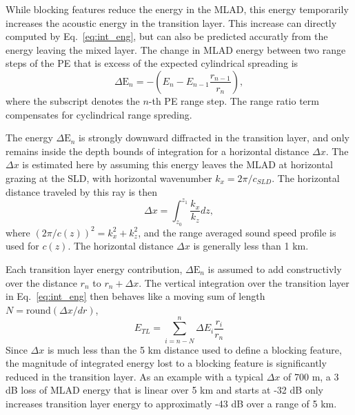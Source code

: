 \documentclass[preprint,NumberedRefs]{JASA}
\begin{document}
While blocking features reduce the energy in the MLAD, this energy temporarily increases the acoustic energy in the transition layer. This increase can directly computed by Eq.~\eqref{eq:int_eng}, but can also be predicted accuratly from the energy leaving the mixed layer. The change in MLAD energy between two range steps of the PE that is excess of the expected cylindrical spreading is
\begin{equation*}
    \Delta \textrm{E}_n = -\left(E_n - E_{n-1} \frac{r_{n-1}}{r_n}\right),
\end{equation*}
where the subscript denotes the $n$-th PE range step. The range ratio term compensates for cyclindrical range spreding.

The energy $\Delta \textrm{E}_n$ is strongly downward diffracted in the transition layer, and only remains inside the depth bounds of integration for a horizontal distance $\Delta x$. The $\Delta x$ is estimated here by assuming this energy leaves the MLAD at horizontal grazing at the SLD, with horizontal wavenumber $k_x = 2 \pi / c_{SLD}$. The horizontal distance traveled by this ray is then
\begin{equation*}
    \Delta x = \int_{z_0}^{z_1} \frac{k_x}{k_z} dz,
\end{equation*}
where $(2 \pi / c(z))^2 = k_x^2 + k_z^2$, and the range averaged sound speed profile is used for $c(z)$. The horizontal distance $\Delta x$ is generally less than 1 km.

Each transition layer energy contribution, $\Delta \textrm{E}_n$ is assumed to add constructivly over the distance $r_n$ to $r_n + \Delta x$. The vertical integration over the transition layer in Eq.~\eqref{eq:int_eng} then behaves like a moving sum of length $N=\textrm{round}(\Delta x / dr)$,
\begin{equation}
    E_{TL} = \sum_{i=n-N}^{n} \Delta E_i \frac{r_i}{r_n}
\end{equation}
Since $\Delta x$ is much less than the 5 km distance used to define a blocking feature, the magnitude of integrated energy lost to a blocking feature is significantly reduced in the transition layer. As an example with a typical $\Delta x$ of 700 m, a 3 dB loss of MLAD energy that is linear over 5 km and starts at -32 dB only increases transition layer energy to approximatly -43 dB over a range of 5 km.
\end{document}
